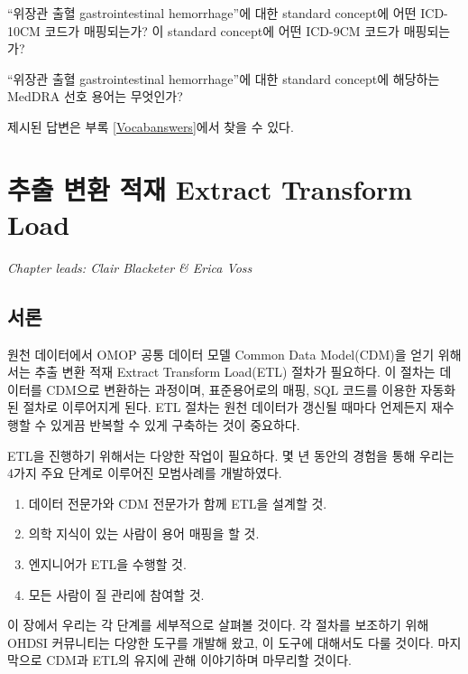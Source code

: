 \documentclass[10.5pt]{book}
\providecommand{\tightlist}{%
  \setlength{\itemsep}{0pt}\setlength{\parskip}{0pt}}
\theoremstyle{definition}
\theoremstyle{definition}
\theoremstyle{definition}
\theoremstyle{remark}
\let\BeginKnitrBlock\begin \let\EndKnitrBlock\end
\begin{document}
\BeginKnitrBlock{exercise}
\protect\hypertarget{exr:exerciseVocab2}{}{\label{exr:exerciseVocab2}
}``위장관 출혈 gastrointestinal hemorrhage''에 대한 standard concept에
어떤 ICD-10CM 코드가 매핑되는가? 이 standard concept에 어떤 ICD-9CM
코드가 매핑되는가?
\EndKnitrBlock{exercise}

\BeginKnitrBlock{exercise}
\protect\hypertarget{exr:exerciseVocab3}{}{\label{exr:exerciseVocab3}
}``위장관 출혈 gastrointestinal hemorrhage''에 대한 standard concept에
해당하는 MedDRA 선호 용어는 무엇인가?
\EndKnitrBlock{exercise}

제시된 답변은 부록 \ref{Vocabanswers}에서 찾을 수 있다.

\chapter{추출 변환 적재 Extract Transform
Load}\label{ExtractTransformLoad}

\emph{Chapter leads: Clair Blacketer \& Erica Voss}

\section{서론}

원천 데이터에서 OMOP 공통 데이터 모델 Common Data Model(CDM)을 얻기
위해서는 추출 변환 적재 Extract Transform Load(ETL) 절차가 필요하다. 이
절차는 데이터를 CDM으로 변환하는 과정이며, 표준용어로의 매핑, SQL 코드를
이용한 자동화된 절차로 이루어지게 된다. ETL 절차는 원천 데이터가 갱신될
때마다 언제든지 재수행할 수 있게끔 반복할 수 있게 구축하는 것이
중요하다. 
 

ETL을 진행하기 위해서는 다양한 작업이 필요하다. 몇 년 동안의 경험을 통해
우리는 4가지 주요 단계로 이루어진 모범사례를 개발하였다.

\begin{enumerate}
\def\labelenumi{\arabic{enumi}.}
\tightlist
\item
  데이터 전문가와 CDM 전문가가 함께 ETL을 설계할 것.
\item
  의학 지식이 있는 사람이 용어 매핑을 할 것.
\item
  엔지니어가 ETL을 수행할 것.
\item
  모든 사람이 질 관리에 참여할 것.
\end{enumerate}

이 장에서 우리는 각 단계를 세부적으로 살펴볼 것이다. 각 절차를 보조하기
위해 OHDSI 커뮤니티는 다양한 도구를 개발해 왔고, 이 도구에 대해서도 다룰
것이다. 마지막으로 CDM과 ETL의 유지에 관해 이야기하며 마무리할 것이다.
\end{document}
